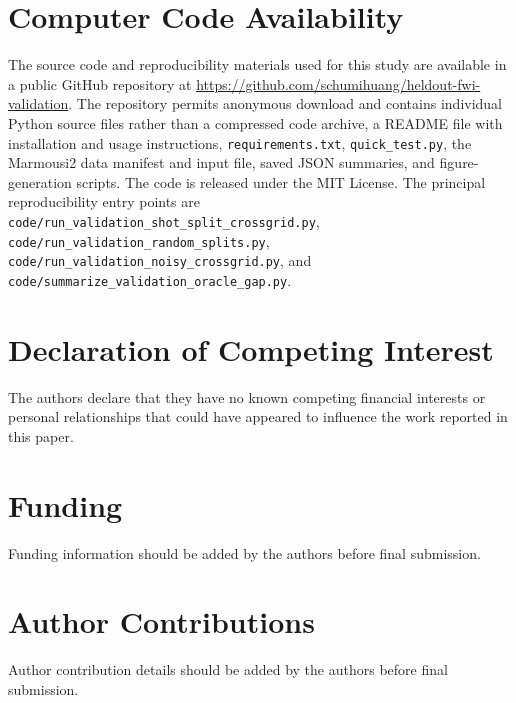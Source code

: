 \documentclass[10pt,twocolumn]{article}
\begin{document}
\section*{Computer Code Availability}
The source code and reproducibility materials used for this study are
available in a public GitHub repository at
\url{https://github.com/schumihuang/heldout-fwi-validation}. The repository
permits anonymous download and contains individual Python source files
rather than a compressed code archive, a README file with installation and
usage instructions, \texttt{requirements.txt}, \texttt{quick\_test.py},
the Marmousi2 data manifest and input file, saved JSON summaries, and
figure-generation scripts. The code is released under the MIT License. The
principal reproducibility entry points are
\texttt{code/run\_validation\_shot\_split\_crossgrid.py},
\texttt{code/run\_validation\_random\_splits.py},
\texttt{code/run\_validation\_noisy\_crossgrid.py}, and
\texttt{code/summarize\_validation\_oracle\_gap.py}.

\section*{Declaration of Competing Interest}
The authors declare that they have no known competing financial interests
or personal relationships that could have appeared to influence the work
reported in this paper.

\section*{Funding}
Funding information should be added by the authors before final
submission.

\section*{Author Contributions}
Author contribution details should be added by the authors before final
submission.



\end{document}
